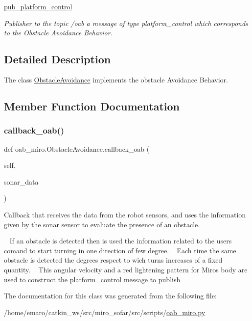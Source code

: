 \begin{DoxyCompactItemize}
\mbox{\label{classoab__miro_1_1ObstacleAvoidance_a1bd2767cd869d8128e963ca793cfb1fc}} 
\mbox{\hyperlink{classoab__miro_1_1ObstacleAvoidance_a1bd2767cd869d8128e963ca793cfb1fc}{pub\+\_\+platform\+\_\+control}}
\begin{DoxyCompactList}\small\item\em Publisher to the topic /oab a message of type platform\+\_\+control which corresponds to the Obstacle Avoidance Behavior. \end{DoxyCompactList}\end{DoxyCompactItemize}


\subsection{Detailed Description}
The class \mbox{\hyperlink{classoab__miro_1_1ObstacleAvoidance}{Obstacle\+Avoidance}} implements the obstacle Avoidance Behavior. 

\subsection{Member Function Documentation}
\mbox{\label{classoab__miro_1_1ObstacleAvoidance_a292e590575d7e28589a60b9c83776fb6}} 
\subsubsection{\texorpdfstring{callback\+\_\+oab()}{callback\_oab()}}
{\footnotesize\ttfamily def oab\+\_\+miro.\+Obstacle\+Avoidance.\+callback\+\_\+oab (\begin{DoxyParamCaption}\item[{}]{self,  }\item[{}]{sonar\+\_\+data }\end{DoxyParamCaption})}



Callback that receives the data from the robot sensors, and uses the information given by the sonar sensor to evaluate the presence of an obstacle. 

~\newline
 If an obstacle is detected then is used the information related to the user\textquotesingle{}s comand to start turning in one direction of few degree. ~\newline
 Each time the same obstacle is detected the degrees respect to wich turns increases of a fixed quantity. ~\newline
 This angular velocity and a red lightening pattern for Miro\textquotesingle{}s body are used to construct the platform\+\_\+control message to publish 

The documentation for this class was generated from the following file\+:\begin{DoxyCompactItemize}
\item 
/home/emaro/catkin\+\_\+ws/src/miro\+\_\+sofar/src/scripts/\mbox{\hyperlink{oab__miro_8py}{oab\+\_\+miro.\+py}}\end{DoxyCompactItemize}
